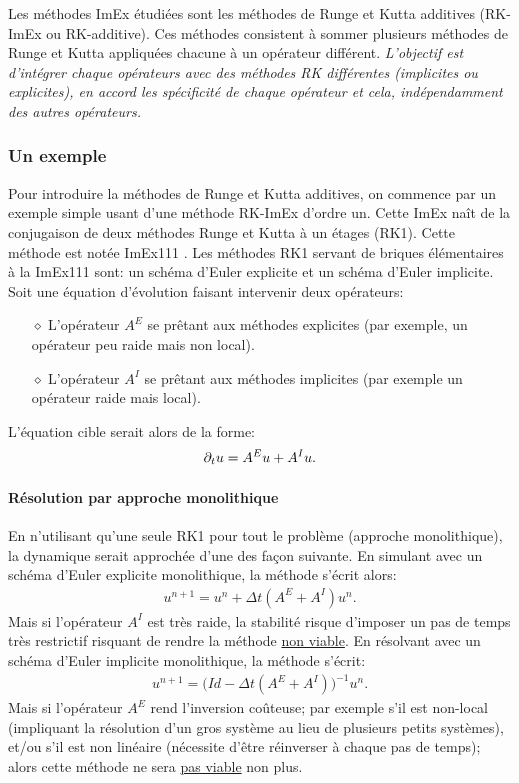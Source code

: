 \label{par:ImEx_presentation}
Les méthodes ImEx étudiées sont les méthodes de Runge et Kutta additives (RK-ImEx ou RK-additive).
Ces méthodes consistent à sommer plusieurs méthodes de Runge et Kutta appliquées chacune à un opérateur différent.
\textit{L'objectif est d'intégrer chaque opérateurs avec des méthodes RK différentes (implicites ou explicites), en accord
les spécificité de chaque opérateur et cela, indépendamment des autres opérateurs.}
\subsubsection{Un exemple}
    Pour introduire la méthodes de Runge et Kutta additives, on commence par un exemple simple usant d'une méthode RK-ImEx
    d'ordre un. Cette ImEx naît de la conjugaison de deux méthodes Runge et Kutta à un étages (RK1). 
    Cette méthode est notée ImEx111 \cite{ASCHER1997151}.
    Les méthodes RK1 servant de briques élémentaires à la ImEx111 sont: un schéma d'Euler explicite et un schéma d'Euler implicite.
    Soit une équation d'évolution faisant intervenir deux opérateurs:
    \begin{itemize}
        \item[$\diamond$] L'opérateur $A^E$ se prêtant aux méthodes explicites (par exemple, un opérateur peu raide mais non local).
        \item[$\diamond$] L'opérateur $A^I$ se prêtant aux méthodes implicites (par exemple un opérateur raide mais local).
    \end{itemize}
    L'équation cible serait alors de la forme: 
    \begin{align}
        \partial_t u = A^E u + A^I u.
    \end{align}
    \paragraph{Résolution par approche monolithique}
        En n'utilisant qu'une seule RK1 pour tout le problème (approche monolithique), la dynamique serait approchée d'une des façon suivante.
            En simulant avec un schéma d'Euler explicite monolithique, la méthode s'écrit alors:
            \begin{align}
                u^{n+1} = u^n + \Delta t (A^E + A^I) u^n.
            \end{align}
            Mais si l'opérateur $A^I$ est très raide, la stabilité risque d'imposer un pas de temps très restrictif risquant de rendre la méthode \underline{non viable}.
            En résolvant avec un schéma d'Euler implicite monolithique, la méthode s'écrit:
            \begin{align}
                u^{n+1} = \bigl(Id - \Delta t (A^E + A^I)\bigr)^{-1} u^n.
            \end{align}
            Mais si l'opérateur $A^E$ rend l'inversion coûteuse;
            par exemple s'il est non-local (impliquant la résolution d'un gros système au lieu de plusieurs petits systèmes), 
            et/ou s'il est non linéaire (nécessite d'être réinverser à chaque pas de temps);
            alors cette méthode ne sera \underline{pas viable} non plus.
